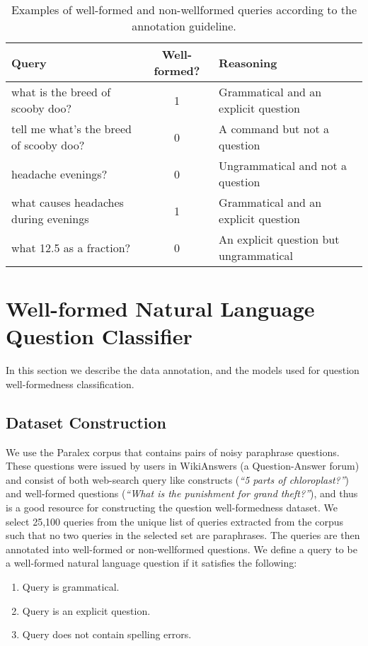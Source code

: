\documentclass[11pt,a4paper]{article}
\begin{document}
\begin{table*}[!th]
  \centering
  \begin{tabular}{|lcl|}
  \hline
    Query & Well-formed? & Reasoning\\
  \hline
  what is the breed of scooby doo? & 1 & Grammatical and an explicit question \\
  tell me what’s the breed of scooby doo? & 0 & A command but not a question \\
  headache evenings? & 0 & Ungrammatical and not a question \\
  what causes headaches during evenings & 1 & Grammatical and an explicit question \\
  what 12.5 as a fraction? & 0 & An explicit question but ungrammatical \\
  \hline
  \end{tabular}
  \caption{Examples of well-formed and non-wellformed queries according to
  the annotation guideline.}
  \label{tab:anno}
\end{table*}

\section{Well-formed Natural Language Question Classifier}
\label{sec:classifier}

In this section we describe the data annotation, and the models used for
question well-formedness classification.

\subsection{Dataset Construction}
\label{sec:data}
We use the Paralex corpus \cite{paralex} that contains pairs of noisy paraphrase questions. These questions were issued by users in WikiAnswers (a Question-Answer forum) and consist of both web-search query like constructs (\textit{``5 parts of chloroplast?''}) and well-formed questions (\textit{``What is the punishment for grand theft?''}), and thus is a good resource for constructing the question well-formedness dataset.
We select 25,100 queries from the unique list of queries extracted from the corpus such
that no two queries in the selected set are paraphrases. The
queries are then annotated into well-formed or non-wellformed questions.
We define a query to be a well-formed natural language question if it satisfies
the following:
\begin{enumerate}
  \itemsep-0.3em
  \item Query is grammatical.
  \item Query is an explicit question.
  \item Query does not contain spelling errors.
\end{enumerate}
\end{document}
